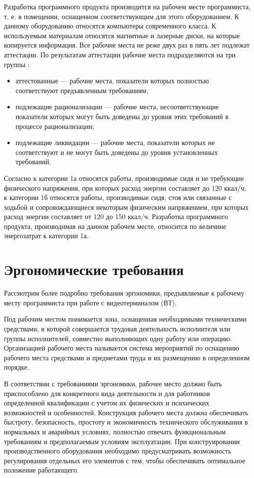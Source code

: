 \documentclass[12pt,a4paper]{report}
\begin{document}
Разработка программного продукта производится на рабочем месте программиста, т. е. в помещении, оснащенном соответствующим для этого оборудованием. К данному оборудованию относятся компьютеры современного класса. К используемым материалам относятся магнитные и лазерные диски, на которые копируется информация. Все рабочие места не реже двух раз в пять лет подлежат аттестации. По результатам аттестации рабочие места подразделяются на три группы \cite{bgd19}:
\begin{itemize}
\item аттестованные — рабочие места, показатели которых полностью соответствуют предъявленным требованиям;
\item подлежащие рационализации — рабочие места, несоответствующие показатели которых могут быть доведены до уровня этих требований в процессе рационализации;
\item подлежащие ликвидации — рабочие места, показатели которых не соответствуют и не могут быть доведены до уровня установленных требований.
\end{itemize}

Согласно \cite{SanPin-Hygiene} к категории 1а относятся работы, производимые сидя и не требующие физического напряжения, при которых расход энергии составляет до 120 ккал/ч; к категории 1б относятся работы, производимые сидя, стоя или связанные с ходьбой и сопровождающиеся некоторым физическим напряжением, при которых расход энергии составляет от 120 до 150 ккал/ч. Разработка программного продукта, производимая на данном рабочем месте, относится по величине энергозатрат к категории 1а.

\section{Эргономические требования}

Рассмотрим более подробно требования эргономики, предъявляемые к рабочему месту программиста при работе с  видеотерминалом (ВТ).

Под рабочим местом понимается зона, оснащенная необходимыми техническими средствами, в которой совершается трудовая деятельность исполнителя или группы исполнителей, совместно выполняющих одну работу или операцию. Организацией рабочего места называется система мероприятий по оснащению рабочего места средствами и предметами труда и их размещению в определенном порядке.

В соответствии с требованиями эргономики, рабочее место должно быть приспособлено для конкретного вида деятельности и для работников определенной квалификации с учетом их физических и психических возможностей и особенностей. Конструкция рабочего места должна обеспечивать быстроту, безопасность, простоту и экономичность технического обслуживания в нормальных и аварийных условиях, полностью отвечать функциональным требованиям и предполагаемым условиям эксплуатации. При конструировании производственного оборудования необходимо предусматривать возможность регулирования отдельных его элементов с тем, чтобы обеспечивать оптимальное положение работающего.
\end{document}
